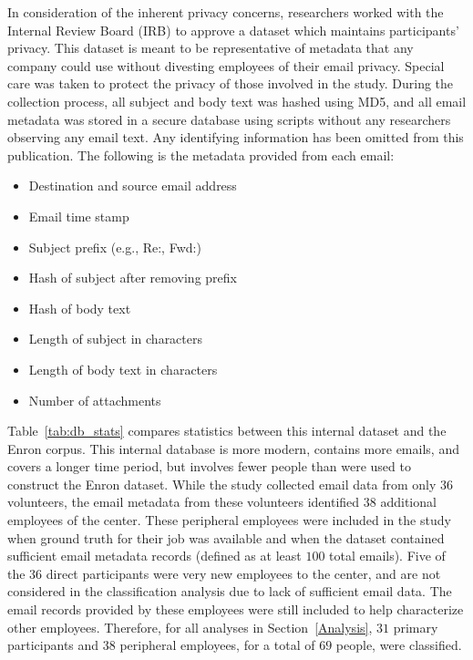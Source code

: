\documentclass[10pt,twocolumn,conference]{IEEEtran}
\begin{document}
In consideration of the inherent privacy concerns, researchers worked with the Internal Review Board (IRB) to approve a dataset which maintains participants' privacy.
This dataset is meant to be representative of metadata that any company could use without divesting employees of their email privacy.
Special care was taken to protect the privacy of those involved in the study.
During the collection process, all subject and body text was hashed using MD5, and all email metadata was stored in a secure database using scripts without any researchers observing any email text.
Any identifying information has been omitted from this publication.
The following is the metadata provided from each email:
\begin{itemize}
\item Destination and source email address
\item Email time stamp
\item Subject prefix (e.g., Re:, Fwd:)
\item Hash of subject after removing prefix
\item Hash of body text
\item Length of subject in characters
\item Length of body text in characters
\item Number of attachments
\end{itemize}

Table~\ref{tab:db_stats} compares statistics between this internal dataset and the Enron corpus.
This internal database is more modern, contains more emails, and covers a longer time period, but involves fewer people than were used to construct the Enron dataset.
While the study collected email data from only $36$ volunteers, the email metadata from these volunteers identified $38$ additional employees of the center.
These peripheral employees were included in the study when ground truth for their job was available and when the dataset contained sufficient email metadata records (defined as at least $100$ total emails).
Five of the $36$ direct participants were very new employees to the center, and are not considered in the classification analysis due to lack of sufficient email data.
The email records provided by these employees were still included to help characterize other employees.
Therefore, for all analyses in Section~\ref{Analysis}, $31$ primary participants and $38$ peripheral employees, for a total of $69$ people, were classified.
\end{document}
